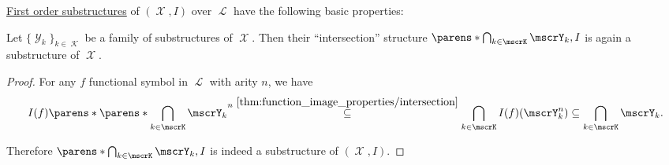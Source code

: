 \begin{proposition}\label{thm:first_order_substructure_properties}
  \hyperref[def:first_order_substructure]{First order substructures} of \( (\mscrX, I) \) over \( \mscrL \) have the following basic properties:
  \begin{thmenum}
     Let \( \{ \mscrY_k \}_{k \in \mscrK} \) be a family of substructures of \( \mscrX \). Then their \enquote{intersection} structure \( \parens*{\bigcap_{k \in \mscrK} \mscrY_k, I} \) is again a substructure of \( \mscrX \).
  \end{thmenum}
\end{proposition}
\begin{proof}
   For any \( f \) functional symbol in \( \mscrL \) with arity \( n \), we have
  \begin{equation*}
    I(f)\parens*{\parens*{\bigcap_{k \in \mscrK} \mscrY_k}^n}
    \overset {\ref{thm:function_image_properties/intersection}} \subseteq
    \bigcap_{k \in \mscrK} I(f)(\mscrY_k^n) \subseteq \bigcap_{k \in \mscrK} \mscrY_k.
  \end{equation*}

  Therefore \( \parens*{\bigcap_{k \in \mscrK} \mscrY_k, I} \) is indeed a substructure of \( (\mscrX, I) \).
\end{proof}

